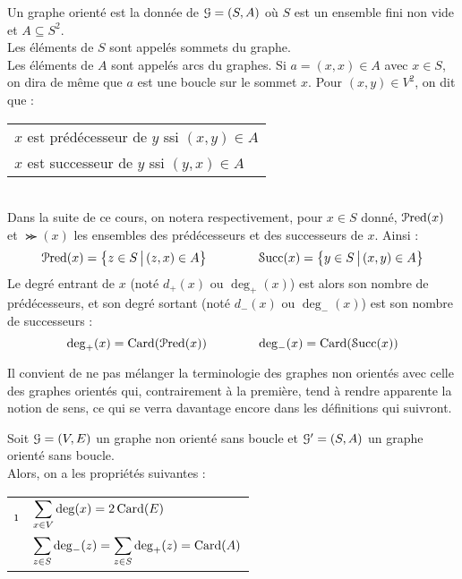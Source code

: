 		\begin{Definitions}
			Un graphe orienté est la donnée de \(\EuScript{G} = (S,A)\) où \(S\) est un ensemble fini non vide et \(A\subseteq S^2\). \\
			\bdot Les éléments de \(S\) sont appelés sommets du graphe. \\
			\bdot Les éléments de \(A\) sont appelés arcs du graphes. \nt
			Si \(a =(x,x) \in A\) avec \(x\in S\), on dira de même que \(a\) est une boucle sur le sommet \(x\). \nll
			Pour \((x,y)\in V^2\), on dit que : \begin{tabular}[t]{l}
				\bdot \(x\) est prédécesseur de \(y\) ssi \((x,y)\in A\) \\
				\bdot \(x\) est successeur de \(y\) ssi \((y,x) \in A\)
			\end{tabular} \\
			\eqskip{3mm}
			Dans la suite de ce cours, on notera respectivement, pour \(x\in S\) donné, \(\EuScript{P}\text{{red}}(x)\) et \(\Succ (x)\) les ensembles des prédécesseurs et des successeurs de \(x\). Ainsi :
				\[
					\EuScript{P}\text{{red}}(x) = \left\{z\in S\,\middle|\, (z,x)\in A\right\} \qquad\qquad \EuScript{S}\text{{ucc}}(x) = \left\{y\in S\,\middle|\, (x,y) \in A\right\}
				\]
			Le degré entrant de \(x\) (noté \(d_+(x)\) ou \(\deg_+(x)\)) est alors son nombre de prédécesseurs, et son degré sortant (noté \(d_-(x)\) ou \(\deg_-(x)\)) est son nombre de successeurs :
				\[
					\deg_+(x) = \operatorname{Card}(\EuScript{P}\text{{red}}(x)) \qquad\qquad \deg_-(x) = \operatorname{Card}(\EuScript{S}\text{{ucc}}(x))
				\]
		\end{Definitions}
		
		\begin{Remarque}
			Il convient de ne pas mélanger la terminologie des graphes non orientés avec celle des graphes orientés qui, contrairement à la première, tend à rendre apparente la notion de sens, ce qui se verra davantage encore dans les définitions qui suivront.
		\end{Remarque}
	\pagebreak
		\colsep{1.5pt}
		\begin{Propriete}
			Soit \(\EuScript{G} = (V,E)\) un graphe non orienté sans boucle et \(\EuScript{G}' = (S,A)\) un graphe orienté sans boucle. \\
			Alors, on a les propriétés suivantes : \nt
				\begin{tabular}[h]{cl}
					\i & \(\displaystyle \sum_{x\in V} \deg(x) = 2\operatorname{Card}(E)\) \\
					\ii & \(\displaystyle \sum_{z\in S} \deg_-(z) = \sum_{z\in S} \deg_+(z) = \operatorname{Card}(A)\)
				\end{tabular}
		\end{Propriete}
		
